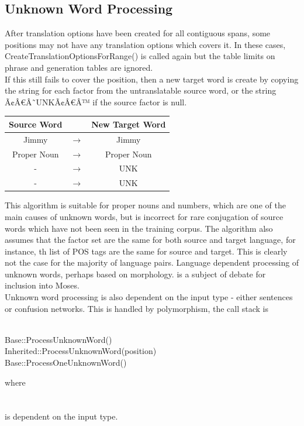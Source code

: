 \documentclass[10pt]{report}
\theoremstyle{plain}
\begin{document}
{\subsection{Unknown Word Processing}
After translation options have been created for all contiguous spans, some positions may not have any translation options which covers it. In these cases, CreateTranslationOptionsForRange() is called again but the table limits on phrase and generation tables are ignored. \\
If this still fails to cover the position, then a new target word is create by copying the string for each factor from the untranslatable source word, or the string Ã¢Â€Â˜UNKÃ¢Â€Â™ if the source factor is null.\\
\begin{center}
\begin{tabular}{|c|c|c|}
\hline
Source Word & & New Target Word \\ \hline
Jimmy	& 	$\to$	& Jimmy\\
Proper Noun	& $\to$	& Proper Noun\\
-	& $\to$	& UNK\\
-	& $\to$	& UNK\\ \hline
\end{tabular}
\end{center}

This algorithm is suitable for proper nouns and numbers, which are one of the main causes of unknown words, but is incorrect for rare conjugation of source words which have not been seen in the training corpus. The algorithm also assumes that the factor set are the same for both source and target language, for instance, th list of POS tags are the same for source and target. This is clearly not the case for the majority of language pairs. Language dependent processing of unknown words, perhaps based on morphology. is a subject of debate for inclusion into Moses.\\
Unknown word processing is also dependent on the input type - either sentences or confusion networks. This is handled by polymorphism, the call stack is\\
\\
\begin{tt}
\indent	Base::ProcessUnknownWord()\\
\indent \indent	Inherited::ProcessUnknownWord(position)\\
\indent \indent \indent	Base::ProcessOneUnknownWord()\\
\end{tt}
where\\
\\
\\
is dependent on the input type.
}
\end{document}
